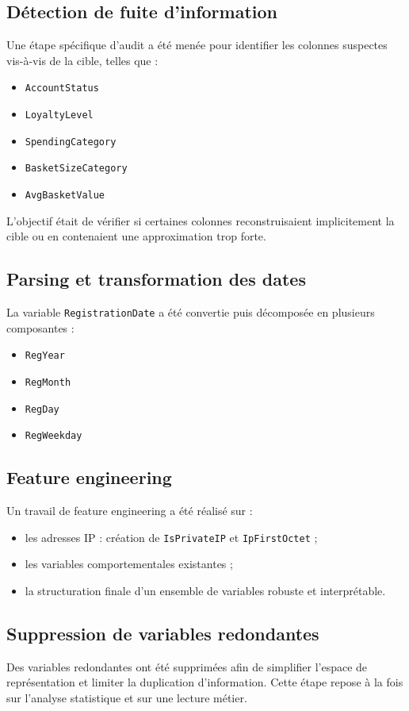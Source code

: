 \documentclass[11pt,a4paper]{article}
\begin{document}
\subsection{Détection de fuite d’information}
Une étape spécifique d’audit a été menée pour identifier les colonnes suspectes vis-à-vis de la cible, telles que :
\begin{itemize}
    \item \texttt{AccountStatus}
    \item \texttt{LoyaltyLevel}
    \item \texttt{SpendingCategory}
    \item \texttt{BasketSizeCategory}
    \item \texttt{AvgBasketValue}
\end{itemize}

L’objectif était de vérifier si certaines colonnes reconstruisaient implicitement la cible ou en contenaient une approximation trop forte.

\subsection{Parsing et transformation des dates}
La variable \texttt{RegistrationDate} a été convertie puis décomposée en plusieurs composantes :
\begin{itemize}
    \item \texttt{RegYear}
    \item \texttt{RegMonth}
    \item \texttt{RegDay}
    \item \texttt{RegWeekday}
\end{itemize}

\subsection{Feature engineering}
Un travail de feature engineering a été réalisé sur :
\begin{itemize}
    \item les adresses IP : création de \texttt{IsPrivateIP} et \texttt{IpFirstOctet} ;
    \item les variables comportementales existantes ;
    \item la structuration finale d’un ensemble de variables robuste et interprétable.
\end{itemize}

\subsection{Suppression de variables redondantes}
Des variables redondantes ont été supprimées afin de simplifier l’espace de représentation et limiter la duplication d’information. Cette étape repose à la fois sur l’analyse statistique et sur une lecture métier.
\end{document}
